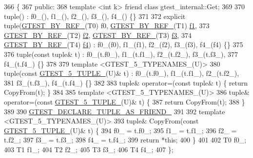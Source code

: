 \begin{DoxyCode}
366                         \{
367  \textcolor{keyword}{public}:
368   \textcolor{keyword}{template} <\textcolor{keywordtype}{int} k> \textcolor{keyword}{friend} \textcolor{keyword}{class }gtest\_internal::Get;
369 
370   tuple() : f0\_(), f1\_(), f2\_(), f3\_(), f4\_() \{\}
371 
372   \textcolor{keyword}{explicit} tuple(\hyperlink{gtest-tuple_8h_adcf9057737a411d833fac0382c13a181}{GTEST\_BY\_REF\_}(T0) f0, \hyperlink{gtest-tuple_8h_adcf9057737a411d833fac0382c13a181}{GTEST\_BY\_REF\_}(T1) 
      \hyperlink{namespacestd_1_1tr1_a9c0fa65b105f8e2f58ba59ecf75fd000}{f1},
373       \hyperlink{gtest-tuple_8h_adcf9057737a411d833fac0382c13a181}{GTEST\_BY\_REF\_}(T2) \hyperlink{namespacestd_1_1tr1_a87dd9e009868361317f587126dba63d4}{f2}, \hyperlink{gtest-tuple_8h_adcf9057737a411d833fac0382c13a181}{GTEST\_BY\_REF\_}(T3) \hyperlink{namespacestd_1_1tr1_a0f7c3b47d27d42d82d1a333ea420ce4e}{f3},
374       \hyperlink{gtest-tuple_8h_adcf9057737a411d833fac0382c13a181}{GTEST\_BY\_REF\_}(T4) \hyperlink{namespacestd_1_1tr1_adc796e02b7385d526aff708189564f67}{f4}) : f0\_(f0), f1\_(f1), f2\_(f2), f3\_(f3), f4\_(f4) \{\}
375 
376   tuple(\textcolor{keyword}{const} tuple& t) : f0\_(t.f0\_), f1\_(t.f1\_), f2\_(t.f2\_), f3\_(t.f3\_),
377       f4\_(t.f4\_) \{\}
378 
379   \textcolor{keyword}{template} <GTEST\_5\_TYPENAMES\_(U)>
380   tuple(\textcolor{keyword}{const} \hyperlink{gtest-tuple_8h_a64e6f4a4cf55f62cde94066c6d5d5c74}{GTEST\_5\_TUPLE\_}(U)& t) : f0\_(t.f0\_), f1\_(t.f1\_), f2\_(t.f2\_),
381       f3\_(t.f3\_), f4\_(t.f4\_) \{\}
382 
383   tuple& operator=(\textcolor{keyword}{const} tuple& t) \{ \textcolor{keywordflow}{return} CopyFrom(t); \}
384 
385   \textcolor{keyword}{template} <GTEST\_5\_TYPENAMES\_(U)>
386   tuple& operator=(\textcolor{keyword}{const} \hyperlink{gtest-tuple_8h_a64e6f4a4cf55f62cde94066c6d5d5c74}{GTEST\_5\_TUPLE\_}(U)& t) \{
387     \textcolor{keywordflow}{return} CopyFrom(t);
388   \}
389 
390   \hyperlink{gtest-tuple_8h_a2b20671273f514a88a6e9b8328e5f257}{GTEST\_DECLARE\_TUPLE\_AS\_FRIEND\_}
391 
392   \textcolor{keyword}{template} <GTEST\_5\_TYPENAMES\_(U)>
393   tuple& CopyFrom(\textcolor{keyword}{const} \hyperlink{gtest-tuple_8h_a64e6f4a4cf55f62cde94066c6d5d5c74}{GTEST\_5\_TUPLE\_}(U)& t) \{
394     f0\_ = t.f0\_;
395     f1\_ = t.f1\_;
396     f2\_ = t.f2\_;
397     f3\_ = t.f3\_;
398     f4\_ = t.f4\_;
399     \textcolor{keywordflow}{return} *\textcolor{keyword}{this};
400   \}
401 
402   T0 f0\_;
403   T1 f1\_;
404   T2 f2\_;
405   T3 f3\_;
406   T4 f4\_;
407 \};
\end{DoxyCode}
